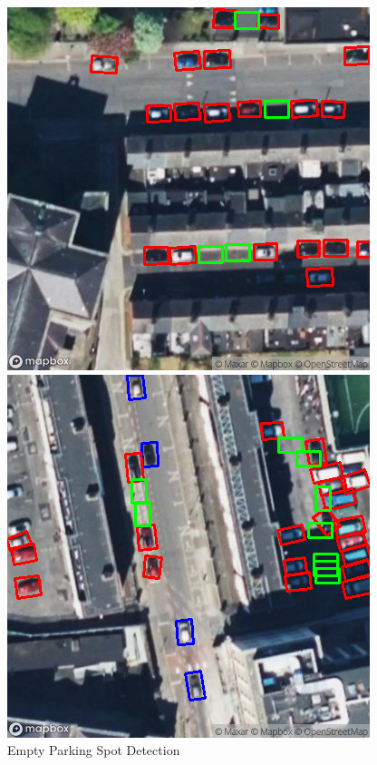 \begin{figure}[htbp]
\begin{minipage}{0.45\textwidth}
    \end{minipage}
    \hfill
    \begin{minipage}{0.45\textwidth}
        \centering
        \includegraphics[width=\textwidth]{images/empty_parking3.png}
    \end{minipage}
    \hfill
    \begin{minipage}{0.45\textwidth}
        \centering
        \includegraphics[width=\textwidth]{images/empty_parking4.png}
    \end{minipage}
    \caption{Empty Parking Spot Detection}
    \label{fig:Empty_parking_detection}
\end{figure}

